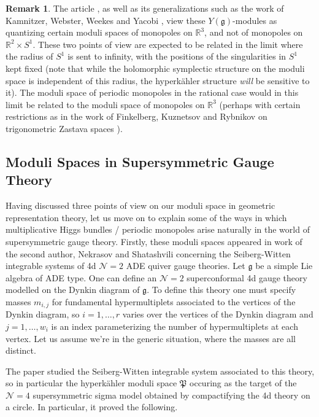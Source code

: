 \documentclass[11pt, oneside, reqno]{amsart}
\theoremstyle{definition} \newtheorem{definition}{Definition}[section]
\theoremstyle{definition} \newtheorem{remark}[definition]{Remark}
\theoremstyle{definition} \newtheorem{remarks}[definition]{Remarks}
\theoremstyle{definition} \newtheorem{question}[definition]{Question}
\theoremstyle{definition} \newtheorem*{note}{Note}
\theoremstyle{definition} \newtheorem{example}[definition]{Example}
\theoremstyle{definition} \newtheorem{examples}[definition]{Examples}
\renewcommand{\gg}{\mathfrak{g}}
\newcommand{\mc}[1]{\mathcal{#1}}
\newcommand{\mf}[1]{\mathfrak{#1}}
\newcommand{\RR}{\mathbb{R}}
\begin{document}
\begin{remark}
The article \cite{GKLO}, as well as its generalizations such as the work of Kamnitzer, Webster, Weekes and Yacobi \cite{KWWY}, view these $Y(\gg)$-modules as quantizing certain moduli spaces of monopoles on $\RR^3$, and not of monopoles on $\RR^2 \times S^1$.  These two points of view are expected to be related in the limit where the radius of $S^1$ is sent to infinity, with the positions of the singularities in $S^1$ kept fixed (note that while the holomorphic symplectic structure on the moduli space is independent of this radius, the hyperk\"ahler structure \emph{will} be sensitive to it).  The moduli space of periodic monopoles in the rational case would in this limit be related to the moduli space of monopoles on $\RR^3$ (perhaps with certain restrictions as in the work of Finkelberg, Kuznetsov and Rybnikov on trigonometric Zastava spaces \cite{FKR}).
\end{remark}

\subsection{Moduli Spaces in Supersymmetric Gauge Theory} \label{intro_gauge_section}
Having discussed three points of view on our moduli space in geometric representation theory, let us move on to explain some of the ways in which multiplicative Higgs bundles / periodic monopoles arise naturally in the world of supersymmetric gauge theory.  Firstly, these moduli spaces appeared in work of the second author, Nekrasov and Shatashvili \cite{NekrasovPestun, NekrasovPestunShatashvili} concerning the Seiberg-Witten integrable systems of 4d $\mc N=2$ ADE quiver gauge theories.  Let $\gg$ be a simple Lie algebra of ADE type.  One can define an $\mc N=2$ superconformal 4d gauge theory modelled on the Dynkin diagram of $\gg$.  To define this theory one must specify masses $m_{i,j}$ for fundamental hypermultiplets associated to the vertices of the Dynkin diagram, so $i = 1,\ldots,r$ varies over the vertices of the Dynkin diagram and $j=1, \ldots,w_i$ is an index parameterizing the number of hypermultiplets at each vertex.  Let us assume we're in the generic situation, where the masses are all distinct.

The paper \cite{NekrasovPestun} studied the Seiberg-Witten integrable system associated to this theory, so in particular the hyperk\"ahler moduli space $\mf P$ occuring as the target of the $\mc N=4$ supersymmetric sigma model obtained by compactifying the 4d theory on a circle.  In particular, it proved the following.
\end{document}
